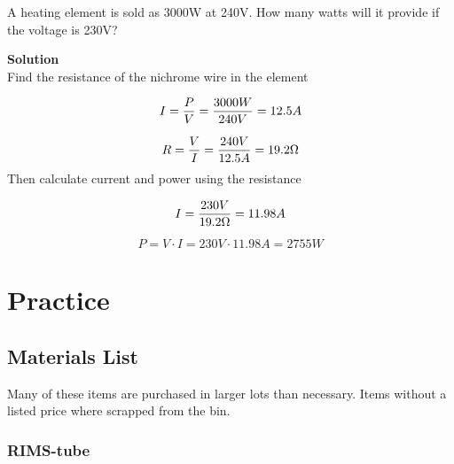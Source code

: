 \documentclass[11pt,fleqn]{book} %
\begin{document}
\begin{exercise}
A heating element is sold as 3000W at 240V. How many watts will it provide if the voltage is 230V?

\textbf{Solution}\\
Find the resistance of the nichrome wire in the element

\begin{equation*}
I = {P \over V} = {3000W \over 240V} = 12.5A
\end{equation*}

\begin{equation*}
R = {V \over I} = {240V \over 12.5A} = 19.2 \Omega
\end{equation*}
Then calculate current and power using the resistance

\begin{equation*}
I = {230V \over 19.2 \Omega} = 11.98A
\end{equation*}

\begin{equation*}
P = V \cdot I = 230V \cdot 11.98A = 2755W
\end{equation*}

\end{exercise}


\part{Practice}



\chapter{Materials List}

Many of these items are purchased in larger lots than necessary. Items without a listed price where scrapped from the bin.

\section{RIMS-tube}
\end{document}
